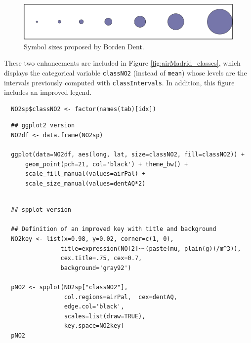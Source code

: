 \begin{figure}[htbp]
\centering
\includegraphics[width=.9\linewidth]{figs/dent.pdf}
\caption{\label{fig:org38bb954}
Symbol sizes proposed by Borden Dent.}
\end{figure}

These two enhancements are included in Figure
\ref{fig:airMadrid_classes}, which displays the categorical variable
\texttt{classNO2} (instead of \texttt{mean}) whose levels are the intervals
previously computed with \texttt{classIntervals}. In addition, this
figure includes an improved legend.

\lstset{language=r,label= ,caption= ,captionpos=b,numbers=none}
\begin{lstlisting}
  NO2sp$classNO2 <- factor(names(tab)[idx])
\end{lstlisting}

\lstset{language=r,label= ,caption= ,captionpos=b,numbers=none}
\begin{lstlisting}
  ## ggplot2 version
  NO2df <- data.frame(NO2sp)
  
  ggplot(data=NO2df, aes(long, lat, size=classNO2, fill=classNO2)) +
      geom_point(pch=21, col='black') + theme_bw() +
      scale_fill_manual(values=airPal) +
      scale_size_manual(values=dentAQ*2)
  
\end{lstlisting}

\lstset{language=r,label= ,caption= ,captionpos=b,numbers=none}
\begin{lstlisting}
  ## spplot version
  
  ## Definition of an improved key with title and background
  NO2key <- list(x=0.98, y=0.02, corner=c(1, 0),
                title=expression(NO[2]~~(paste(mu, plain(g))/m^3)),
                cex.title=.75, cex=0.7,
                background='gray92')
  
  pNO2 <- spplot(NO2sp["classNO2"],
                 col.regions=airPal,  cex=dentAQ,
                 edge.col='black',
                 scales=list(draw=TRUE),
                 key.space=NO2key)
  pNO2
\end{lstlisting}


